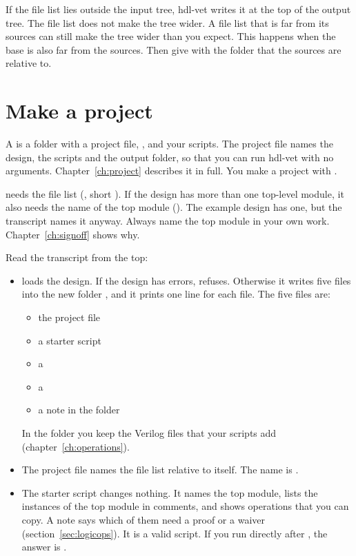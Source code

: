 If the file list lies outside the input tree, hdl-vet writes
it at the top of the output tree. The file list does not make the tree wider. A file
list that is far from its sources can still make the tree wider than you expect.
This happens when the base is also far from the sources. Then give  with the folder that the
sources are relative to.

\section{Make a project}

A  is a folder with a project file, , and your
scripts. The project file names the design, the scripts and the output folder, so
that you can run hdl-vet with no arguments. Chapter~\ref{ch:project} describes it
in full. You make a project with .

 needs the file list (, short ). If the
design has more than one top-level module, it also needs the name of the top module
(). The example design has one, but the transcript names it anyway.
Always name the top module in your own work. Chapter~\ref{ch:signoff} shows why.



Read the transcript from the top:

\begin{itemize}
\item {} loads the design. If the design has errors, 
  refuses. Otherwise it writes five files into the new folder , and it
  prints one line for each file. The five files are:
  \begin{itemize}
  \item the project file
  \item a starter script
  \item a 
  \item a 
  \item a note in the folder 
  \end{itemize}
  In the folder  you keep the Verilog files that your scripts add
  (chapter~\ref{ch:operations}).
\item The project file names the file list relative to itself. The name is
  .
\item The starter script changes nothing. It names the top module, lists the
  instances of the top module in comments, and shows operations that you can
  copy. A note says which of them need a proof or a waiver
  (section~\ref{sec:logicops}). It is a valid script. If you run  directly after
  , the answer is .
\end{itemize}

